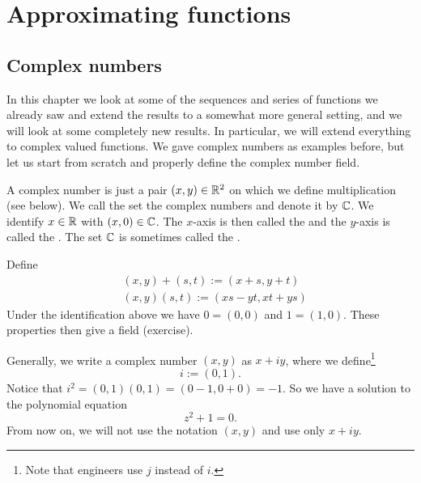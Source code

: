 
\chapter{Approximating functions} \label{approx:chapter}


\section{Complex numbers}
\label{sec:complexnums}


In this chapter we look at some of the sequences and series of functions
we already saw and extend the results to a somewhat more general setting,
and we will look at some completely new results.
In particular, we will extend everything to
complex valued functions.  We gave complex numbers as examples before, but
let us start from scratch and properly define the complex number field.

A complex number is just a pair $(x,y) \in {\mathbb{R}}^2$ on which we define
multiplication (see below).
We call the set the complex numbers and denote it by ${\mathbb{C}}$.
We identify $x \in {\mathbb{R}}$ with $(x,0) \in {\mathbb{C}}$.
The $x$-axis is then called the \emph{} and the $y$-axis is
called the \emph{}.  The set ${\mathbb{C}}$ is sometimes called the
\emph{}.


Define
\begin{align*}
& (x,y) + (s,t) := (x+s,y+t) \\
& (x,y) (s,t) := (xs-yt,xt+ys)
\end{align*}
Under the identification above we have $0 = (0,0)$ and $1 = (1,0)$.  These
properties then give a field (exercise).

Generally, we write a complex number $(x,y)$ as $x+iy$, where we
define\footnote{Note that engineers use $j$ instead of $i$.}
\begin{equation*}
i := (0,1) .
\end{equation*}
Notice that $i^2 = (0,1)(0,1) = (0-1,0+0) = -1$.
So we have a solution to the polynomial equation
\begin{equation*}
z^2+1=0 .
\end{equation*}
From now on, we will not use the notation $(x,y)$ and use only $x+iy$.

